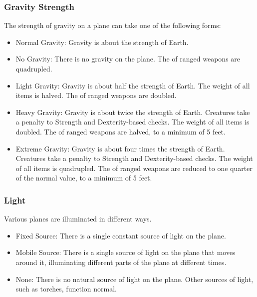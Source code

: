         \subsubsection{Gravity Strength} The strength of gravity on a plane can take one of the following forms:
            \begin{itemize}
                \item Normal Gravity: Gravity is about the strength of Earth.
                \item No Gravity: There is no gravity on the plane.
                    The  of ranged weapons are quadrupled.
                \item Light Gravity: Gravity is about half the strength of Earth.
                    The weight of all items is halved.
                    The  of ranged weapons are doubled.
                \item Heavy Gravity: Gravity is about twice the strength of Earth.
                    Creatures take a  penalty to Strength and Dexterity-based checks.
                    The weight of all items is doubled.
                    The  of ranged weapons are halved, to a minimum of 5 feet.
                \item Extreme Gravity: Gravity is about four times the strength of Earth.
                    Creatures take a  penalty to Strength and Dexterity-based checks.
                    The weight of all items is quadrupled.
                    The  of ranged weapons are reduced to one quarter of the normal value, to a minimum of 5 feet.
            \end{itemize}

        \subsubsection{Light} Various planes are illuminated in different ways.
            \begin{itemize}
                \item Fixed Source: There is a single constant source of light on the plane.
                \item Mobile Source: There is a single source of light on the plane that moves around it, illuminating different parts of the plane at different times.
                \item None: There is no natural source of light on the plane.
                    Other sources of light, such as torches, function normal.
            \end{itemize}

